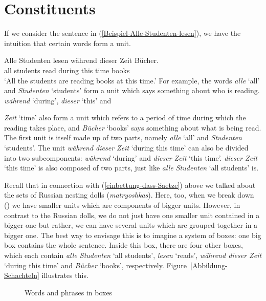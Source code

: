 \section{Constituents}
\label{konstituententests}\label{sec-constituents}

If we consider the sentence in (\ref{Beispiel-Alle-Studenten-lesen}), we have the intuition that
certain words form a unit.

\ea
\label{Beispiel-Alle-Studenten-lesen}
\gll Alle Studenten lesen während dieser Zeit Bücher.\\
     all  students  read  during  this   time books\\
\glt `All the students are reading books at this time.'
\z
For example, the words \emph{alle} `all' and \emph{Studenten} `students' form a unit which says something about who is
reading. \emph{während} `during', \emph{dieser} `this' and {\emph{Zeit} `time' also form a unit which refers to a period
  of time during which the reading takes place, and \emph{Bücher} `books' says something about what is
  being read. The first unit is itself made up of two parts, namely \emph{alle} `all'
and \emph{Studenten} `students'. The unit \emph{während dieser Zeit} `during this time' can also be divided into two
subcomponents: \emph{während} `during' and \emph{dieser Zeit} `this time'. \emph{dieser Zeit} `this time' is also composed of two
parts, just like \emph{alle Studenten} `all students' is. 

Recall that in connection with (\ref{einbettung-dass-Saetze}) above we talked about the sets of Russian nesting dolls (\emph{matryoshkas}). Here, too, when we break down () we have smaller units which are
components of bigger units. However, in contrast to the Russian dolls, we do not just have one
smaller unit contained in a bigger one but rather, we can have several units which are grouped
together in a bigger one. The best way to envisage this is to imagine a system of boxes: 
one big box contains the whole sentence. Inside this box, there are four other boxes, which each
contain \emph{alle Studenten} `all students', \emph{lesen} `reads', \emph{während
  dieser Zeit} `during this time' and \emph{Bücher} `books', respectively.
Figure~\vref{Abbildung-Schachteln} illustrates this.

\begin{figure}
\centering
{}
\caption{\label{Abbildung-Schachteln}Words and phrases in boxes}
\end{figure}%

}
